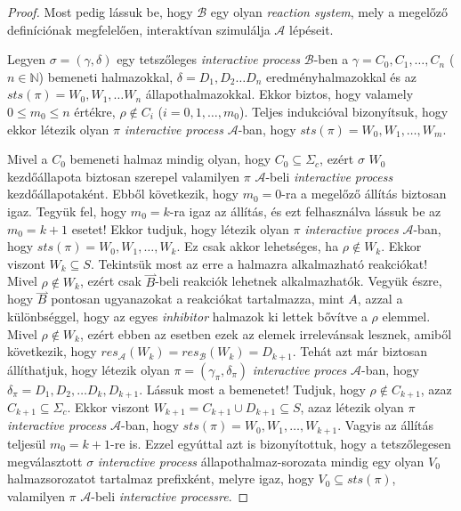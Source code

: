 \documentclass[12pt]{article}
\theoremstyle{definition}
\theoremstyle{remark}
\theoremstyle{plain}
\theoremstyle{plain}
\newcommand{\forwardhat}{\overset{\rightharpoonup}}
\newcommand{\res}{\textit{res}}
\begin{document}
\begin{proof}
        Most pedig lássuk be, hogy $\mathscr{B}$ egy olyan \textit{reaction system}, mely a megelőző definíciónak megfelelően, interaktívan szimulálja $\mathscr{A}$ lépéseit.

        Legyen $\sigma = (\gamma, \delta)$ egy tetszőleges \textit{interactive process} $\mathscr{B}$-ben a $\gamma = C_{0}, C_{1}, \ldots, C_{n}$ ($n \in \mathbb{N}$) bemeneti halmazokkal, $\delta = D_{1}, D_{2} \ldots D_{n}$ eredményhalmazokkal és az $\textit{sts}(\pi)=W_{0},W_{1},\ldots W_{n}$ állapothalmazokkal. Ekkor biztos, hogy valamely $0 \leq m_{0} \leq n$ értékre, $\rho \notin C_{i}$ ($i = 0, 1, \ldots, m_{0}$). Teljes indukcióval bizonyítsuk, hogy ekkor létezik olyan $\pi$ \textit{interactive process} $\mathscr{A}$-ban, hogy $\textit{sts}(\pi) = W_{0}, W_{1}, \ldots, W_{m}$.
        
        Mivel a $C_{0}$ bemeneti halmaz mindig olyan, hogy $C_{0} \subseteq \Sigma_{c}$, ezért $\sigma$ $W_{0}$ kezdőállapota biztosan szerepel valamilyen $\pi$ $\mathscr{A}$-beli \textit{interactive process} kezdőállapotaként. Ebből következik, hogy $m_{0} = 0$-ra a megelőző állítás biztosan igaz. Tegyük fel, hogy $m_{0} = k$-ra igaz az állítás, és ezt felhasználva lássuk be az $m_{0} = k + 1$ esetet! Ekkor tudjuk, hogy létezik olyan $\pi$ \textit{interactive proces} $\mathscr{A}$-ban, hogy $\textit{sts}(\pi) = W_{0}, W_{1}, \ldots, W_{k}$. Ez csak akkor lehetséges, ha $\rho \notin W_{k}$. Ekkor viszont $W_{k} \subseteq S$. Tekintsük most az erre a halmazra alkalmazható reakciókat! Mivel $\rho \notin W_{k}$, ezért csak $\forwardhat B$-beli reakciók lehetnek alkalmazhatók. Vegyük észre, hogy $\forwardhat B$ pontosan ugyanazokat a reakciókat tartalmazza, mint $A$, azzal a különbséggel, hogy az egyes \textit{inhibitor} halmazok ki lettek bővítve a $\rho$ elemmel. Mivel $\rho \notin W_{k}$, ezért ebben az esetben ezek az elemek irrelevánsak lesznek, amiből következik, hogy $\res_{\mathscr{A}}(W_{k}) = \res_{\mathscr{B}}(W_{k}) = D_{k + 1}$. Tehát azt már biztosan állíthatjuk, hogy létezik olyan $\pi = (\gamma_{\pi}, \delta_{\pi})$ \textit{interactive proces} $\mathscr{A}$-ban, hogy $\delta_{\pi} = D_{1}, D_{2}, \ldots D_{k}, D_{k + 1}$. Lássuk most a bemenetet! Tudjuk, hogy $\rho \notin C_{k + 1}$, azaz $C_{k + 1} \subseteq \Sigma_{c}$. Ekkor viszont $W_{k + 1} = C_{k + 1} \cup D_{k + 1} \subseteq S$, azaz létezik olyan $\pi$ \textit{interactive process} $\mathscr{A}$-ban, hogy $\textit{sts}(\pi)=W_{0}, W_{1}, \ldots, W_{k + 1}$. Vagyis az állítás teljesül $m_{0} = k + 1$-re is.  Ezzel egyúttal azt is bizonyítottuk, hogy a tetszőlegesen megválasztott $\sigma$ \textit{interactive process} állapothalmaz-sorozata mindig egy olyan $V_{0}$ halmazsorozatot tartalmaz prefixként, melyre igaz, hogy $V_{0} \subseteq \textit{sts}(\pi)$, valamilyen $\pi$ $\mathscr{A}$-beli \textit{interactive processre}.
        

\end{proof}
\end{document}

